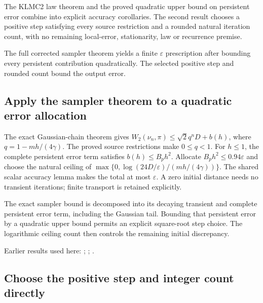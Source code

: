 \documentclass[11pt,a4paper]{report}
\begin{document}
The KLMC2 law theorem and the proved quadratic upper bound on persistent error combine into explicit accuracy corollaries. The second result chooses a positive step satisfying every source restriction and a rounded natural iteration count, with no remaining local-error, stationarity, law or recurrence premise.



The full corrected sampler theorem yields a finite \(\varepsilon\) prescription after bounding every persistent contribution quadratically. The selected positive step and rounded count bound the output error.

\subsection{\texorpdfstring{Apply the sampler theorem to a quadratic error allocation}{Apply the sampler theorem to a quadratic error allocation}}
\label{report-step-KineticLangevin-SecondOrderAccuracy-lean-1}


The exact Gaussian-chain theorem gives \(W_2(\nu_n,\pi)\le\sqrt2q^nD+b(h)\), where \(q=1-mh/(4\gamma)\). The proved source restrictions make \(0\le q<1\). For \(h\le1\), the complete persistent error term satisfies \(b(h)\le B_ph^2\). Allocate \(B_ph^2\le0.94\varepsilon\) and choose the natural ceiling of \(\max\{0,\log(24D/\varepsilon)/(mh/(4\gamma))\}\). The shared scalar accuracy lemma makes the total at most \(\varepsilon\). A zero initial distance needs no transient iterations; finite transport is retained explicitly.



The exact sampler bound is decomposed into its decaying transient and complete persistent error term, including the Gaussian tail. Bounding that persistent error by a quadratic upper bound permits an explicit square-root step choice. The logarithmic ceiling count then controls the remaining initial discrepancy.



Earlier results used here: \cite[Section~3.17.3]{LangevinLean2026ULASC}; \cite[Section~3.17.4]{LangevinLean2026ULASC}; \cite[Section~3.26.3]{LangevinLean2026ULASC}.
\subsection{\texorpdfstring{Choose the positive step and integer count directly}{Choose the positive step and integer count directly}}
\label{report-step-KineticLangevin-SecondOrderAccuracy-lean-2}
\end{document}
